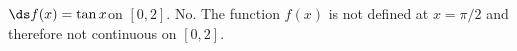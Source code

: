 {$\ds f(x) = \tan x$\quad  on \quad $[0,2]$.
}
{No.  The function $f(x)$ is not defined at $x=\pi/2$ and therefore not continuous on $[0,2]$.
}
